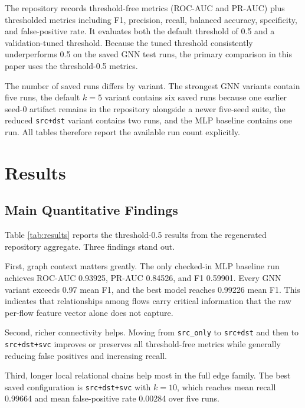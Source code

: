 \documentclass[conference]{IEEEtran}
\begin{document}
The repository records threshold-free metrics (ROC-AUC and PR-AUC) plus thresholded metrics including F1, precision, recall, balanced accuracy, specificity, and false-positive rate. It evaluates both the default threshold of 0.5 and a validation-tuned threshold. Because the tuned threshold consistently underperforms 0.5 on the saved GNN test runs, the primary comparison in this paper uses the threshold-0.5 metrics.

The number of saved runs differs by variant. The strongest GNN variants contain five runs, the default $k=5$ variant contains six saved runs because one earlier seed-0 artifact remains in the repository alongside a newer five-seed suite, the reduced \texttt{src+dst} variant contains two runs, and the MLP baseline contains one run. All tables therefore report the available run count explicitly.

\section{Results}
\subsection{Main Quantitative Findings}
Table \ref{tab:results} reports the threshold-0.5 results from the regenerated repository aggregate. Three findings stand out.

First, graph context matters greatly. The only checked-in MLP baseline run achieves ROC-AUC 0.93925, PR-AUC 0.84526, and F1 0.59901. Every GNN variant exceeds 0.97 mean F1, and the best model reaches 0.99226 mean F1. This indicates that relationships among flows carry critical information that the raw per-flow feature vector alone does not capture.

Second, richer connectivity helps. Moving from \texttt{src\_only} to \texttt{src+dst} and then to \texttt{src+dst+svc} improves or preserves all threshold-free metrics while generally reducing false positives and increasing recall.

Third, longer local relational chains help most in the full edge family. The best saved configuration is \texttt{src+dst+svc} with $k=10$, which reaches mean recall 0.99664 and mean false-positive rate 0.00284 over five runs.
\end{document}
